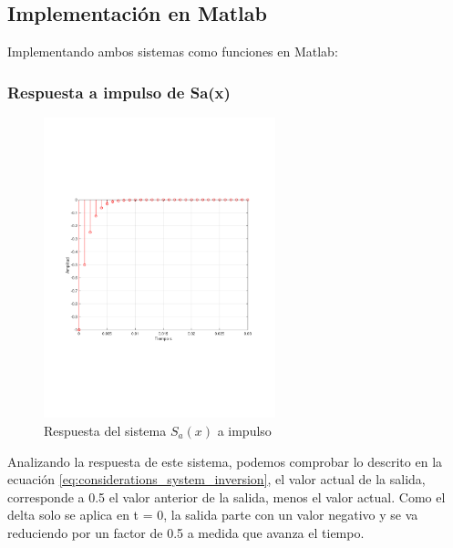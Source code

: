 	\subsection{Implementación en Matlab}
 		Implementando ambos sistemas como funciones en Matlab:
 		
 		\begin{figure}[H]
 			
 		\end{figure}
 		
 		\subsubsection{Respuesta a impulso de Sa(x)}
 			\begin{figure}[H]
 				\center
 				\includegraphics[width=0.6\textwidth,clip, trim = {2cm 7.0cm 2.2cm 7.0cm}]{../imgs/2_Sa.pdf}
				\caption{Respuesta del sistema $S_{a}(x)$ a impulso}
 				\label{fig:2_Sa}
 			\end{figure}
			Analizando la respuesta de este sistema, podemos comprobar lo descrito en la ecuación \ref{eq:considerations_system_inversion}, el valor actual de la salida, corresponde a 0.5 el valor anterior de la salida, menos el valor actual. Como el delta solo se aplica en t = 0, la salida parte con un valor negativo y se va reduciendo por un factor de 0.5 a medida que avanza el tiempo. 
			

